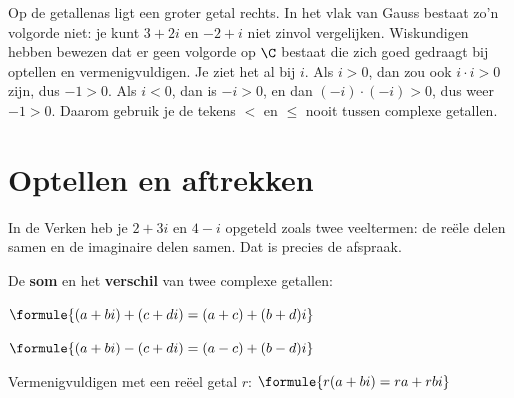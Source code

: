 
Op de getallenas ligt een groter getal rechts. In het vlak van Gauss bestaat zo'n volgorde niet: je kunt $3 + 2i$ en $-2 + i$ niet zinvol vergelijken. Wiskundigen hebben bewezen dat er geen volgorde op $\C$ bestaat die zich goed gedraagt bij optellen en vermenigvuldigen. Je ziet het al bij $i$. Als $i > 0$, dan zou ook $i \cdot i > 0$ zijn, dus $-1 > 0$. Als $i < 0$, dan is $-i > 0$, en dan $(-i) \cdot (-i) > 0$, dus weer $-1 > 0$. Daarom gebruik je de tekens $<$ en $\leqslant$ nooit tussen complexe getallen.

\begin{oefeningen}
\end{oefeningen}

\section{Optellen en aftrekken}

In de Verken heb je $2 + 3i$ en $4 - i$ opgeteld zoals twee veeltermen: de reële delen samen en de imaginaire delen samen. Dat is precies de afspraak.

\begin{theorie}
De \textbf{\textcolor{accent}{som}} en het \textbf{\textcolor{accent}{verschil}} van twee complexe getallen:

\vspace{1mm}
\qquad $\formule{(a + bi) + (c + di) = (a + c) + (b + d)i}$

\vspace{1mm}
\qquad $\formule{(a + bi) - (c + di) = (a - c) + (b - d)i}$

\vspace{1mm}
Vermenigvuldigen met een reëel getal $r$: \quad $\formule{r(a + bi) = ra + rbi}$
\end{theorie}

